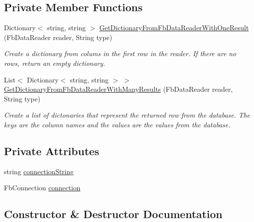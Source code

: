\subsection*{Private Member Functions}
\begin{DoxyCompactItemize}
\item 
Dictionary$<$ string, string $>$ \hyperlink{class_e_l_i_server_1_1_database_manager_a4ccfa58357d3f8e7fd495f78a117856e}{Get\+Dictionary\+From\+Fb\+Data\+Reader\+With\+One\+Result} (Fb\+Data\+Reader reader, String type)
\begin{DoxyCompactList}\small\item\em Create a dictionary from colums in the first row in the reader. If there are no rows, return an empty dictionary. \end{DoxyCompactList}\item 
List$<$ Dictionary$<$ string, string $>$ $>$ \hyperlink{class_e_l_i_server_1_1_database_manager_a9732d7fca81399afcb1ad6f5f01a42f3}{Get\+Dictionary\+From\+Fb\+Data\+Reader\+With\+Many\+Results} (Fb\+Data\+Reader reader, String type)
\begin{DoxyCompactList}\small\item\em Create a list of dictonaries that represent the returned row from the database. The keys are the column names and the values are the values from the database. \end{DoxyCompactList}\end{DoxyCompactItemize}
\subsection*{Private Attributes}
\begin{DoxyCompactItemize}
\item 
string \hyperlink{class_e_l_i_server_1_1_database_manager_abd72094260884e6f8d417bc2a3d6f192}{connection\+String}
\item 
Fb\+Connection \hyperlink{class_e_l_i_server_1_1_database_manager_a34b35f163316da5270e526b1d0f51889}{connection}
\end{DoxyCompactItemize}


\subsection{Constructor \& Destructor Documentation}
\mbox{\label{class_e_l_i_server_1_1_database_manager_af4932c44cd155cec929be0207f17605e}} 
